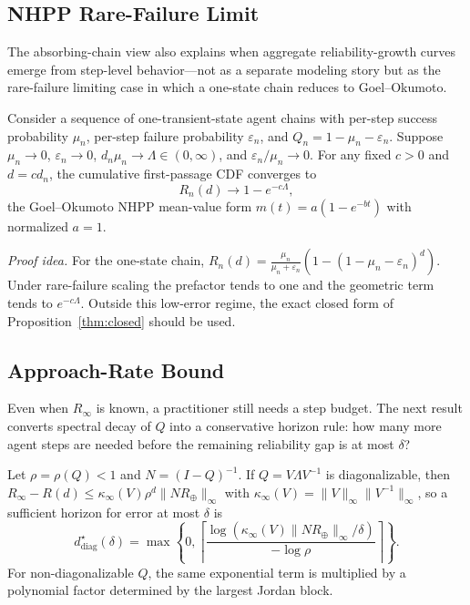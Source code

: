 \subsection{NHPP Rare-Failure Limit}

The absorbing-chain view also explains when aggregate
reliability-growth curves emerge from step-level behavior---not as a
separate modeling story but as the rare-failure limiting case in which
a one-state chain reduces to Goel--Okumoto.

\begin{proposition}
\label{thm:nhpp}
Consider a sequence of one-transient-state agent chains with per-step
success probability $\mu_n$, per-step failure probability
$\varepsilon_n$, and $Q_n=1-\mu_n-\varepsilon_n$. Suppose
$\mu_n\to0$, $\varepsilon_n\to0$, $d_n\mu_n\to\Lambda\in(0,\infty)$,
and $\varepsilon_n/\mu_n\to0$. For any fixed $c>0$ and $d=cd_n$, the
cumulative first-passage CDF converges to
\begin{equation}
R_n(d)\to 1-e^{-c\Lambda},
\label{eq:t5-GO}
\end{equation}
the Goel--Okumoto NHPP mean-value form $m(t)=a(1-e^{-bt})$ with
normalized $a=1$.
\end{proposition}

\noindent\emph{Proof idea.}
For the one-state chain,
$R_n(d)=\frac{\mu_n}{\mu_n+\varepsilon_n}
\left(1-(1-\mu_n-\varepsilon_n)^d\right)$. Under rare-failure
scaling the prefactor tends to one and the geometric term tends to
$e^{-c\Lambda}$. Outside this low-error regime, the exact closed form
of Proposition~\ref{thm:closed} should be used.

\subsection{Approach-Rate Bound}

Even when $R_\infty$ is known, a practitioner still needs a step
budget. The next result converts spectral decay of $Q$ into a
conservative horizon rule: how many more agent steps are needed before
the remaining reliability gap is at most $\delta$?

\begin{proposition}
\label{thm:mixing}
Let $\rho=\rho(Q)<1$ and $N=(I-Q)^{-1}$. If
$Q=V\Lambda V^{-1}$ is diagonalizable, then
$R_\infty-R(d)\le\kappa_\infty(V)\rho^d\|NR_\oplus\|_\infty$
with $\kappa_\infty(V)=\|V\|_\infty\|V^{-1}\|_\infty$, so a
sufficient horizon for error at most $\delta$ is
\begin{equation}
d^\star_{\mathrm{diag}}(\delta)=
\max\!\left\{0,\left\lceil
\frac{\log(\kappa_\infty(V)\|NR_\oplus\|_\infty/\delta)}
     {-\log\rho}
\right\rceil\right\}.
\label{eq:t6-steps-diag}
\end{equation}
For non-diagonalizable $Q$, the same exponential term is multiplied
by a polynomial factor determined by the largest Jordan block.
\end{proposition}

